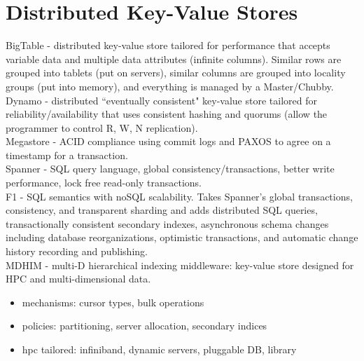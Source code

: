 \documentclass{article}
\begin{document}
\section{Distributed Key-Value Stores}
\noindent\cite{chang:osdi2006-bigtable} BigTable - distributed key-value store tailored for performance that accepts variable data and multiple data attributes (infinite columns). Similar rows are grouped into tablets (put on servers), similar columns are grouped into locality groups (put into memory), and everything is managed by a Master/Chubby.\\

\noindent\cite{decandia:sosp2007-dynamo} Dynamo - distributed ``eventually consistent" key-value store tailored for reliability/availability that uses consistent hashing and quorums (allow the programmer to control R, W, N replication).\\

\noindent\cite{} Megastore - ACID compliance using commit logs and PAXOS to agree on a timestamp for a transaction.\\

\noindent\cite{} Spanner - SQL query language, global consistency/transactions, better write performance, lock free read-only transactions.\\ 

\noindent\cite{} F1 - SQL semantics with noSQL scalability. Takes Spanner's global transactions, consistency, and transparent sharding and adds distributed SQL queries, transactionally consistent secondary indexes, asynchronous schema changes including database reorganizations, optimistic transactions, and automatic change history recording and publishing.\\

\noindent\cite{greenberg:hotstorage2015-mdhim} MDHIM - multi-D hierarchical
indexing middleware: key-value store designed for HPC and multi-dimensional
data. 

\begin{itemize}
  \item mechanisms: cursor types, bulk operations
  \item policies: partitioning, server allocation, secondary indices
  \item hpc tailored: infiniband, dynamic servers, pluggable DB, library
\end{itemize}
\end{document}
